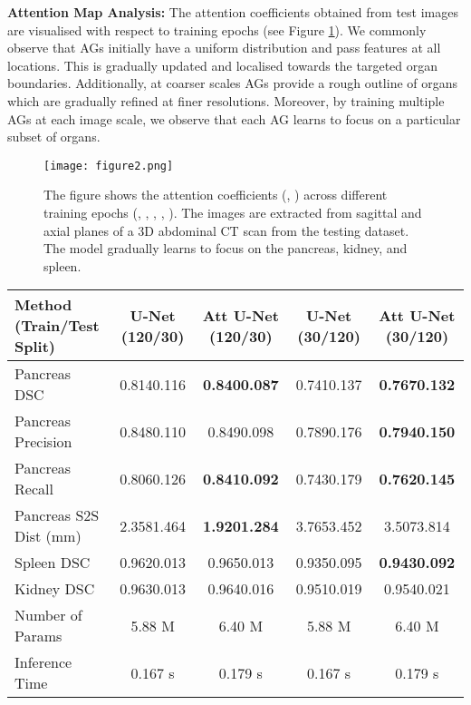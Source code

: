 \documentclass{article}
\begin{document}
\textbf{Attention Map Analysis:} The attention coefficients obtained from test images are visualised with respect to training epochs (see Figure \ref{fig:attentions_vs_epochs}). We commonly observe that AGs initially have a uniform distribution and pass features at all locations. This is gradually updated and localised towards the targeted organ boundaries. Additionally, at coarser scales AGs provide a rough outline of organs which are gradually refined at finer resolutions. Moreover, by training multiple AGs at each image scale, we observe that each AG learns to focus on a particular subset of organs. 

\begin{figure}[!t]
	\centering
	\texttt{[image: figure2.png]}
	\caption{The figure shows the attention coefficients (, ) across different training epochs (, , , , ). The images are extracted from sagittal and axial planes of a 3D abdominal CT scan from the testing dataset. The model gradually learns to focus on the pancreas, kidney, and spleen.}
	\label{fig:attentions_vs_epochs}
\end{figure}

\begin{table}[t]\footnotesize
	\parbox{\textwidth}{
		\label{tab:results_attention_1}
		\vspace{2 mm}
		\begin{tabular}{@{\extracolsep{1pt}}lcccc@{}} 
			Method (Train/Test Split) & U-Net (120/30) & Att U-Net (120/30) & U-Net (30/120) & Att U-Net (30/120)\\ \midrule 
			
			Pancreas DSC       &   0.8140.116   & \textbf{0.8400.087} &  0.7410.137 & \textbf{0.7670.132} \\
			Pancreas Precision &   0.8480.110   & 0.8490.098          &  0.7890.176 & \textbf{0.7940.150} \\
			Pancreas Recall    &   0.8060.126   & \textbf{0.8410.092} &  0.7430.179 & \textbf{0.7620.145} \\
			Pancreas S2S Dist (mm) & 2.3581.464 & \textbf{1.9201.284} &  3.7653.452 & 3.5073.814 \\ \midrule
			Spleen DSC     &  0.9620.013 & 0.9650.013 & 0.9350.095 & \textbf{0.9430.092} \\
			Kidney DSC     &  0.9630.013 & 0.9640.016 & 0.9510.019 & 0.9540.021 \\
			Number of Params    &  5.88 M          & 6.40 M          & 5.88 M  & 6.40 M \\
			Inference Time &  0.167 s         & 0.179 s         & 0.167 s & 0.179 s\\ 			\midrule
		\end{tabular}
	}
\end{table}
\end{document}
